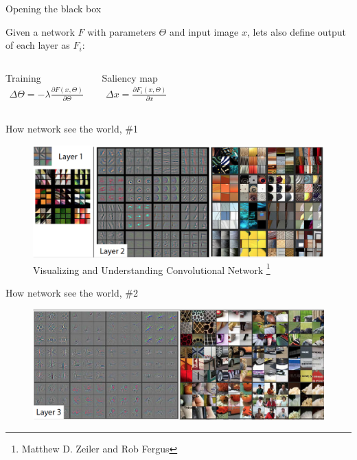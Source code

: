 \documentclass{beamer}
\begin{document}
\begin{frame}{Opening the black box}

Given a network $F$ with parameters $\Theta$ and input image $x$, lets also define output of each layer as $F_i$:
\begin{columns}[t]
\begin{block}{Training}
\begin{eqnarray*}
\Delta\Theta = -\lambda \frac{\partial F\left(x, \Theta \right)}{\partial \Theta}
\end{eqnarray*}
\end{block}
	
\begin{block}{Saliency map}
\begin{eqnarray*}
\Delta x = \frac{\partial F_i\left(x, \Theta \right)}{\partial x}
\end{eqnarray*}
\end{block}
	
\end{columns}

\end{frame}


\begin{frame}{How network see the world, \#1}

\begin{figure}[h!]
  \centering
  \includegraphics[width=1\textwidth]{images/features1.png}
  \caption{Visualizing and Understanding Convolutional Network \footnote{Matthew D. Zeiler and Rob Fergus}}
\end{figure}

\end{frame}


\begin{frame}{How network see the world, \#2}

\begin{figure}[h!]
  \centering
  \includegraphics[width=1\textwidth]{images/features2.png}
\end{figure}

\end{frame}
\end{document}
